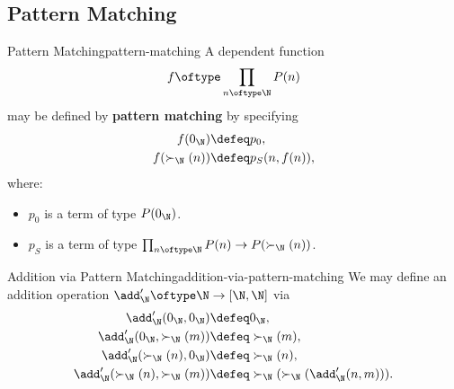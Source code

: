 \subsection{Pattern Matching}\label{subsection-pattern-matching}
\begin{definition}{Pattern Matching}{pattern-matching}%
    A dependent function
    \[
        f%
        \oftype%
        \prod_{n\oftype\N}P(n)%
    \]%
    may be defined by \textbf{pattern matching} by specifying
    \begin{align*}
        f(0_{\N})        &\defeq p_{0},\\
        f(\succ_{\N}(n)) &\defeq p_{S}(n,f(n)),%
    \end{align*}
    where:
    \begin{itemize}
        \item $p_{0}$ is a term of type $P(0_{\N})$.
        \item $p_{S}$ is a term of type $\prod_{n\oftype\N}P(n)\to P(\succ_{\N}(n))$.
    \end{itemize}
\end{definition}
\begin{example}{Addition via Pattern Matching}{addition-via-pattern-matching}%
    We may define an addition operation $\add'_{\N}\oftype\N\to[\N,\N]$ via
    \begin{align*}
        \add'_{\N}(0_{\N},0_{\N})               &\defeq 0_{\N},\\%
        \add'_{\N}(0_{\N},\succ_{\N}(m))        &\defeq \succ_{\N}(m),\\%
        \add'_{\N}(\succ_{\N}(n),0_{\N})        &\defeq \succ_{\N}(n),\\%
        \add'_{\N}(\succ_{\N}(n),\succ_{\N}(m)) &\defeq \succ_{\N}(\succ_{\N}(\add'_{\N}(n,m))).%
    \end{align*}
\end{example}
